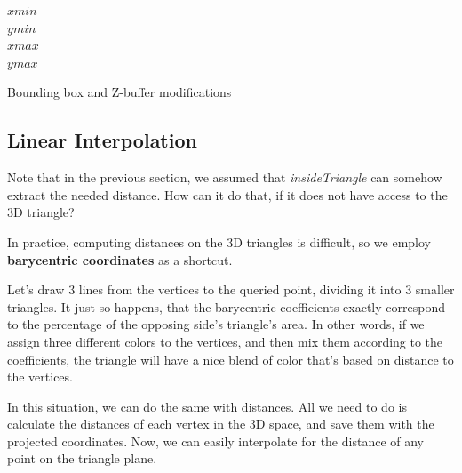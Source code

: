 \documentclass{article}
\begin{document}
\begin{algorithm}[H]
    
    $xmin$ \leftarrow {}\\
    $ymin$ \leftarrow {}\\
    $xmax$ \leftarrow {}\\
    $ymax$ \leftarrow {}\\
    \BlankLine
    \caption{Bounding box and Z-buffer modifications}\label{algo_bounding}
\end{algorithm}

\subsection{Linear Interpolation}

Note that in the previous section, we assumed that \textit{insideTriangle} can somehow extract the needed distance.
How can it do that, if it does not have access to the 3D triangle? 

In practice, computing distances on the 3D triangles is difficult, so we employ \textbf{barycentric coordinates} as a shortcut.

Let's draw 3 lines from the vertices to the queried point, dividing it into 3 smaller triangles.
It just so happens, that the barycentric coefficients exactly correspond to the percentage of the opposing side's triangle's area.
In other words, if we assign three different colors to the vertices, and then mix them according to the coefficients, the triangle will have a nice blend of color that's based on distance to the vertices.

In this situation, we can do the same with distances.
All we need to do is calculate the distances of each vertex in the 3D space, and save them with the projected coordinates.
Now, we can easily interpolate for the distance of any point on the triangle plane.
\end{document}
